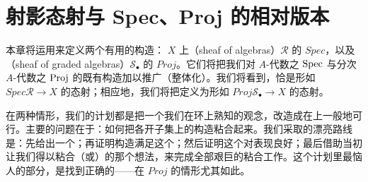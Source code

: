 
\chapter{射影态射与 Spec、Proj 的相对版本}
\label{ch:projective-morphisms}

本章将运用\trUniversalProperty{}来定义两个有用的构造：\trScheme{} $X$ 上\trSheafOfAlgebras（sheaf of algebras）$\mathscr{R}$ 的 $\mathit{Spec}$，以及\trSheafOfGradedAlgebras（sheaf of graded algebras）$\mathscr{S}_\bullet$ 的 $\mathit{Proj}$。它们将把我们对 $A$-代数之 $\operatorname{Spec}$ 与分次 $A$-代数之 $\operatorname{Proj}$ 的既有构造加以推广（整体化）。我们将看到，\trAffine\trMorphism{}恰是形如 $\mathit{Spec}\mathscr{R}\to X$ 的态射；相应地，我们将把\trProjective\trMorphism{}定义为形如 $\mathit{Proj}\mathscr{S}_\bullet\to X$ 的态射。

在两种情形，我们的计划都是把一个我们在环上熟知的观念，改造成在\trScheme{}上一般地可行。主要的问题在于：如何把各\trAffine{}开子集上的构造粘合起来。我们采取的漂亮路线是：先给出一个\trUniversalProperty；再证明\trAffine{}构造满足这个\trUniversalProperty；然后证明这个\trUniversalProperty{}对\trOpenSubset{}表现良好；最后借助当初让我们得以粘合\trFiberProduct（或\trNormalization）的那个想法，来完成全部艰巨的粘合工作。这个计划里最恼人的部分，是找到正确的\trUniversalProperty——在 $\mathit{Proj}$ 的情形尤其如此。




